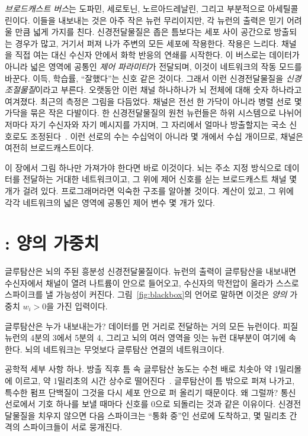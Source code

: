 \emph{브로드캐스트 버스}는 도파민, 세로토닌, 노르아드레날린, 그리고 부분적으로 아세틸콜린이다. 이들을 내보내는 것은 아주 작은 뉴런 무리이지만, 각 뉴런의 출력은 믿기 어려울 만큼 넓게 가지를 친다. 신경전달물질은 좁은 틈보다는 세포 사이 공간으로 방출되는 경우가 많고, 거기서 퍼져 나가 주변의 모든 세포에 작용한다. 작용은 느리다. 채널을 직접 여는 대신 수신자 안에서 화학 반응의 연쇄를 시작한다. 이 버스로는 데이터가 아니라 넓은 영역에 공통인 \emph{제어 파라미터}가 전달되며, 이것이 네트워크의 작동 모드를 바꾼다. 이득, 학습률, “잘했다”는 신호 같은 것이다. 그래서 이런 신경전달물질을 \emph{신경조절물질}이라고 부른다. 오랫동안 이런 채널 하나하나가 뇌 전체에 대해 숫자 하나라고 여겨졌다. 최근의 측정은 그림을 다듬었다. 채널은 전선 한 가닥이 아니라 병렬 선로 몇 가닥을 묶은 작은 다발이다. 한 신경전달물질의 원천 뉴런들은 하위 시스템으로 나뉘어 저마다 자기 수신자와 자기 메시지를 가지며, 그 자리에서 얼마나 방출할지는 국소 신호로도 조정된다~\cite{Ren2018,Poe2020}. 이런 선로의 수는 수십억이 아니라 몇 개에서 수십 개이므로, 채널은 여전히 브로드캐스트이다.

이 장에서 그림 하나만 가져가야 한다면 바로 이것이다. 뇌는 주소 지정 방식으로 데이터를 전달하는 거대한 네트워크이고, 그 위에 제어 신호를 싣는 브로드캐스트 채널 몇 개가 걸려 있다. 프로그래머라면 익숙한 구조를 알아볼 것이다. 계산이 있고, 그 위에 각각 네트워크의 넓은 영역에 공통인 제어 변수 몇 개가 있다.

\section{: 양의 가중치}

글루탐산은 뇌의 주된 흥분성 신경전달물질이다. 뉴런의 출력이 글루탐산을 내보내면 수신자에서 채널이 열려 나트륨이 안으로 들어오고, 수신자의 막전압이 올라가 스스로 스파이크를 낼 가능성이 커진다. 그림~\ref{fig:blackbox}의 언어로 말하면 이것은 \emph{양의} 가중치 $w_i>0$을 가진 입력이다.

글루탐산은 누가 내보내는가? 데이터를 먼 거리로 전달하는 거의 모든 뉴런이다. 피질 뉴런의 4분의 3에서 5분의 4, 그리고 뇌의 여러 영역을 잇는 뉴런 대부분이 여기에 속한다. 뇌의 네트워크는 무엇보다 글루탐산 연결의 네트워크이다.

공학적 세부 사항 하나. 방출 직후 틈 속 글루탐산 농도는 수천 배로 치솟아 약 1밀리몰에 이르고, 약 1밀리초의 시간 상수로 떨어진다~\cite{Clements1992}. 글루탐산이 틈 밖으로 퍼져 나가고, 특수한 펌프 단백질이 그것을 다시 세포 안으로 퍼 올리기 때문이다. 왜 그럴까? 통신 선로에서 기호 하나를 보낼 때마다 신호를 0으로 되돌리는 것과 같은 이유이다. 신경전달물질을 치우지 않으면 다음 스파이크는 “통화 중”인 선로에 도착하고, 몇 밀리초 간격의 스파이크들이 서로 뭉개진다.

